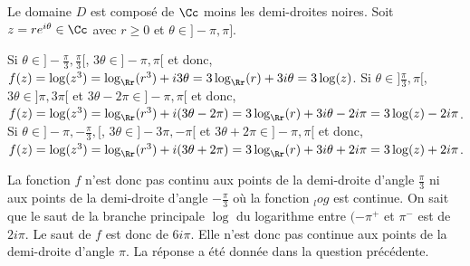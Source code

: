 {\begin{enumerate}
{Le domaine $D$ est composé de $\Cc$ moins les demi-droites noires. 
Soit $z=re^{i\theta}\in\Cc$ avec $r\geq 0$ et $\theta\in ]-\pi,\pi]$.
\begin{itemize}
Si $\theta\in]-\frac{\pi}{3},\frac{\pi}{3}[$, $ 3\theta\in]-\pi,\pi[$
 et donc, $f(z)=\log(z^3)=\log_\Rr(r^3)+i3\theta=3\log_\Rr(r)+3i\theta=3\log(z)$.
Si $\theta\in]\frac{\pi}{3},\pi[$, $ 3\theta\in]\pi,3\pi[$ et $ 3\theta-2\pi\in]-\pi,\pi[$
 et donc, $f(z)=\log(z^3)=\log_\Rr(r^3)+i(3\theta-2\pi)=3\log_\Rr(r)+3i\theta-2i\pi=3\log(z)-2i\pi$.
Si $\theta\in]-\pi,-\frac{\pi}{3},[$, $ 3\theta\in]-3\pi,-\pi[$ et $ 3\theta+2\pi\in]-\pi,\pi[$
 et donc, $f(z)=\log(z^3)=\log_\Rr(r^3)+i(3\theta+2\pi)=3\log_\Rr(r)+3i\theta+2i\pi=3\log(z)+2i\pi$.
\end{itemize}
La fonction $f$ n'est donc pas continu aux points de la demi-droite d'angle $\frac{\pi}{3}$ 
ni aux points de la demi-droite d'angle $-\frac{\pi}{3}$ où la fonction $_log$ est continue.
On sait que le saut de la branche principale $\log$ du logarithme entre $(-\pi^+$ et $\pi^-$
est de $2i\pi$. Le saut de $f$ est donc de $6i\pi$. Elle n'est donc pas continue
aux points de la demi-droite d'angle $\pi$.
La réponse a été donnée dans la question précédente.
}
\end{enumerate}
}

